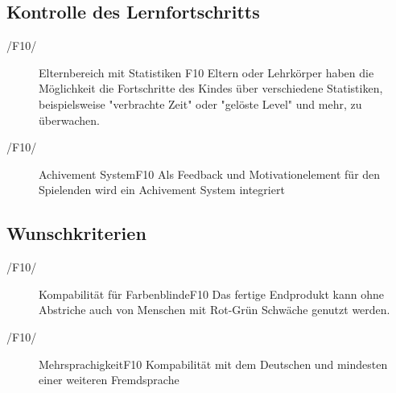 \subsection{Kontrolle des Lernfortschritts}

\begin{description}
	\item[/F10/] Elternbereich mit Statistiken {F10} \newline
	Eltern oder Lehrkörper haben die Möglichkeit die Fortschritte des Kindes über verschiedene Statistiken, beispielsweise "verbrachte Zeit" oder "gelöste Level" und mehr,  zu überwachen.
	\item[/F10/] Achivement System{F10} \newline
	Als Feedback und Motivationelement für den Spielenden wird ein Achivement System integriert 
\end{description}

\subsection{Wunschkriterien}

\begin{description}
	\item[/F10/]Kompabilität für Farbenblinde{F10} \newline
	Das fertige Endprodukt kann ohne Abstriche auch von Menschen mit Rot-Grün Schwäche genutzt werden.
	\item[/F10/] Mehrsprachigkeit{F10} \newline
	Kompabilität mit dem Deutschen und mindesten einer weiteren Fremdsprache
\end{description}